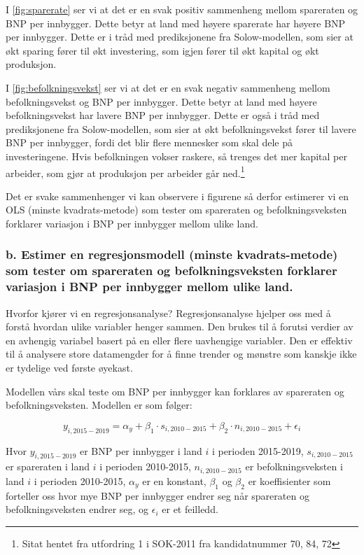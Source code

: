 \documentclass[
  12pt,
  a4paper,
  DIV=11,
  numbers=noendperiod]{scrartcl}
\begin{document}
I \autoref{fig:sparerate} ser vi at det er en svak positiv sammenheng
mellom spareraten og BNP per innbygger. Dette betyr at land med høyere
sparerate har høyere BNP per innbygger. Dette er i tråd med
prediksjonene fra Solow-modellen, som sier at økt sparing fører til økt
investering, som igjen fører til økt kapital og økt produksjon.

I \autoref{fig:befolkningsvekst} ser vi at det er en svak negativ
sammenheng mellom befolkningsvekst og BNP per innbygger. Dette betyr at
land med høyere befolkningsvekst har lavere BNP per innbygger. Dette er
også i tråd med prediksjonene fra Solow-modellen, som sier at økt
befolkningsvekst fører til lavere BNP per innbygger, fordi det blir
flere mennesker som skal dele på investeringene. Hvis befolkningen
vokser raskere, så trenges det mer kapital per arbeider, som gjør at
produksjon per arbeider går ned.\footnote{Sitat hentet fra utfordring 1
  i SOK-2011 fra kandidatnummer 70, 84, 72}

Det er svake sammenhenger vi kan observere i figurene så derfor
estimerer vi en OLS (minste kvadrats-metode) som tester om spareraten og
befolkningsveksten forklarer variasjon i BNP per innbygger mellom ulike
land.

\clearpage

\subsubsection{b. Estimer en regresjonsmodell (minste kvadrats-metode)
som tester om spareraten og befolkningsveksten forklarer variasjon i BNP
per innbygger mellom ulike
land.}\label{b.-estimer-en-regresjonsmodell-minste-kvadrats-metode-som-tester-om-spareraten-og-befolkningsveksten-forklarer-variasjon-i-bnp-per-innbygger-mellom-ulike-land.}

Hvorfor kjører vi en regresjonsanalyse? Regresjonsanalyse hjelper oss
med å forstå hvordan ulike variabler henger sammen. Den brukes til å
forutsi verdier av en avhengig variabel basert på en eller flere
uavhengige variabler. Den er effektiv til å analysere store datamengder
for å finne trender og mønstre som kanskje ikke er tydelige ved første
øyekast.

Modellen vårs skal teste om BNP per innbygger kan forklares av
spareraten og befolkningsveksten. Modellen er som følger:

\[ y_{i,2015-2019} = \alpha_y + \beta_1 \cdot s_{i,2010-2015} + \beta_2 \cdot n_{i,2010-2015} + \epsilon_i \]

Hvor \(y_{i,2015-2019}\) er BNP per innbygger i land \(i\) i perioden
2015-2019, \(s_{i,2010-2015}\) er spareraten i land \(i\) i perioden
2010-2015, \(n_{i,2010-2015}\) er befolkningsveksten i land \(i\) i
perioden 2010-2015, \(\alpha_y\) er en konstant, \(\beta_1\) og
\(\beta_2\) er koeffisienter som forteller oss hvor mye BNP per
innbygger endrer seg når spareraten og befolkningsveksten endrer seg, og
\(\epsilon_i\) er et feilledd.
\end{document}
